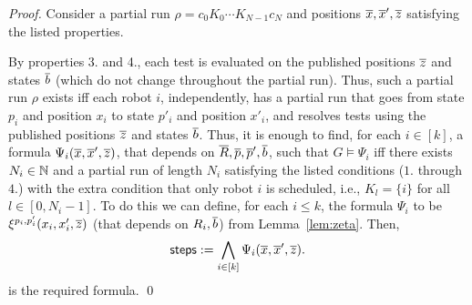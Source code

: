 \begin{proof}
Consider a partial run $\rho = c_0K_0 \cdots K_{N-1}c_N$ and positions $\overline{x},\overline{x}',\overline{z}$ 
satisfying the listed properties. 


By properties 3. and 4., each test is evaluated on the published positions $\overline{z}$ and states $\overline{b}$ (which do not change throughout the partial run).
Thus, such a partial run $\rho$ exists iff each robot $i$, independently, has a partial run that goes from state $p_i$ and position $x_i$ to state $p'_i$ and position $x'_i$, and resolves tests using the published positions $\overline{z}$ and states $\overline{b}$.  
Thus, it is enough to find, for each $i \in [k]$, a formula $\Psi_{i}(\overline{x},\overline{x}',\overline{z})$, that depends on $\overline{R},\overline{p},\overline{p}',\overline{b}$, such that $G \models \Psi_i$ iff there exists $N_i \in \mathbb{N}$ and a partial run of length $N_i$ satisfying the listed conditions ($1.$ through $4.$) with the extra condition that only robot $i$ is scheduled, i.e., $K_l = \{i\}$ for all $l \in [0,N_i-1]$. To do this we can define, for each $i \leq k$, the formula $\Psi_i$ to be $\xi^{p_i,p'_i}(x_i,x'_i,\overline{z})$ (that depends on $R_i,\overline{b}$) from Lemma~\ref{lem:zeta}. 
Then, 
\[ 
\mathsf{steps} := \bigwedge_{i \in [k]} \Psi_i(\overline{x},\overline{x}',\overline{z}).
\]
is the required formula. \qed





\end{proof}

